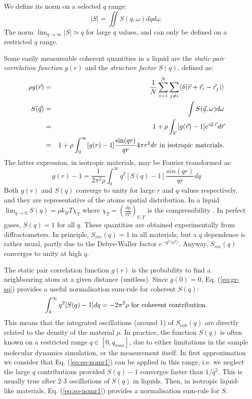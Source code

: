 We define its norm on a selected $q$ range:
\begin{equation}
|S| = \iint S(q,\omega) dq d\omega .
\end{equation}
The norm $\lim_{q \rightarrow \infty} |S| \simeq q$ for large $q$ values, and can only be defined on a restricted $q$ range.

Some easily measureable coherent quantities in a liquid are the \emph{static pair correlation function} $g(r)$ and the \emph{structure factor} $S(q)$, defined as:
\begin{eqnarray}
\rho g(\vec{r}) &=& \frac{1}{N} \sum_{i=1}^N \sum_{j \neq i} \langle \delta(\vec{r}+\vec{r}_i-\vec{r}_j) \rangle \\
S(\vec{q}) &=&\int S(\vec q,\omega) d\omega \label{eq:sq} \\
           &=&1 + \rho \int_V [g(\vec{r})-1] e^{i\vec{q}.\vec{r}} d\vec{r} \\
           &=&1 + \rho \int_{0}^{\infty} [g(r)-1] \frac{\sin(qr)}{qr} 4 \pi r^2 dr {\rm\ in\ isotropic\ materials.}
\end{eqnarray}
The latter expression, in isotropic materials, may be Fourier transformed as:
\begin{equation}
\label{eq:gr-sq}
g(r)-1 =\frac{1}{2\pi^2 \rho} \int_0^\infty q^2 [S(q) -1] \frac{sin(qr)}{qr} dq
\end{equation}
Both $g(r)$ and $S(q)$ converge to unity for large $r$ and $q$ values respectively, and they are representative of the atoms spatial distribution. In a liquid $\lim_{q \rightarrow 0} S(q) = \rho k_B T \chi_T$ where $\chi_T=(\frac{\partial \rho}{\partial P})_{V,T}$ is the compressibility \cite{Egelstaff67,fischer05}. In perfect gases, $S(q) = 1$ for all $q$. These quantities are obtained experimentally from diffractometers.
In principle, $S_{inc}(q) = 1$ in all materials, but a $q$ dependence is rather usual, partly due to the Debye-Waller factor $e^{-q^2 \langle u^2 \rangle}$. Anyway, $S_{inc}(q)$ converges to unity at high $q$.

The static pair correlation function $g(r)$ is the probability to find a neighbouring atom at a given distance (unitless). Since $g(0) = 0$, Eq. (\ref{eq:gr-sq}) provides a useful normalisation sum-rule for coherent $S(q)$:
\begin{equation}
\label{eq:sq-nomr1}
\int_0^\infty q^2 [S(q) - 1] dq = -2\pi^2\rho {\rm\ for\ coherent\ contribution.}
\end{equation}
This means that the integrated oscillations (around 1) of $S_{coh}(q)$ are directly related to the density of the material $\rho$.
In practice, the function $S(q)$ is often known on a restricted range $q \in [0, q_{max} ]$, due to either limitations in the sample molecular dynamics simulation, or the measurement itself.
In first approximation we consider that Eq. (\ref{eq:sq-nomr1}) can be applied in this range, i.e. we neglect the large $q$ contributions provided $S(q)-1$ converges faster than $1/q^2$. This is usually true after 2-3 oscillations of $S(q)$ in liquids.
Then, in isotropic liquid-like materials, Eq. (\ref{eq:sq-nomr1}) provides a normalisation sum-rule for $S$.

